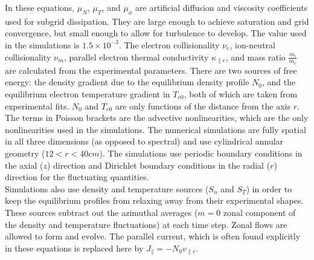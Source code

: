 \documentclass[12pt]{article}
\def\para{\parallel}
\newcommand{\vpe}{v_{\parallel e}}
\newcommand{\nue}{\nu_{e}}
\newcommand{\nuin}{\nu_{in}}
\newcommand{\kpe}{\kappa_{\parallel e}}
\newcommand{\fmie}{\frac{m_i}{m_e}}
\begin{document}
In these equations, $\mu_N$, $\mu_T$, and $\mu_\phi$ are artificial diffusion and viscosity coefficients used for subgrid dissipation. They are large enough to achieve saturation
and grid convergence, but small enough to allow for turbulence to develop. The value used in the simulations is $1.5 \times 10^{-3}$. The electron collisionality $\nue$, ion-neutral
collisionality $\nuin$, parallel electron thermal conductivity $\kpe$, and mass ratio $\fmie$ are calculated from the experimental parameters.
There are two sources of free energy: the density gradient due to the equilibrium density profile $N_0$, and the equilibrium electron temperature gradient in $T_{e0}$, both of which are
taken from experimental fits. $N_0$ and $T_{e0}$ are only functions of the distance from the axis $r$. \\

The terms in Poisson brackets are the advective nonlinearities, which are the only nonlinearities used in the simulations.
The numerical simulations are fully spatial in all three dimensions (as opposed to spectral) and use cylindrical annular geometry ($12<r<40 cm$).
The simulations use periodic boundary conditions in the axial ($z$) direction and Dirichlet boundary
conditions in the radial ($r$) direction for the fluctuating quantities. \\

Simulations also use density and temperature sources ($S_n$ and $S_T$) in order to keep the equilibrium profiles from relaxing away from their experimental shapes. 
These sources subtract out the azimuthal averages ($m=0$ zonal component of the density and temperature fluctuations) at each time step. 
Zonal flows are allowed to form and evolve. The parallel current, which is often found explicitly in these equations is replaced here by $J_\para = - N_0 \vpe$. \\
\end{document}
